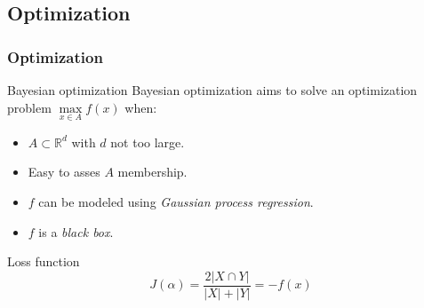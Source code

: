     \subsection{Optimization}
    \begin{frame}
        \frametitle{Optimization}
         {
            \begin{block}{Bayesian optimization}
                Bayesian optimization aims to solve an optimization problem $\max\limits_{x\in A}f\left(x\right)$ when:
                \begin{itemize}
                    \item $A \subset \mathbb{R}^d$ with $d$ not too large.
                    \item Easy to asses $A$ membership.
                    \item $f$ can be modeled using \emph{Gaussian process regression}.
                    \item $f$ is a \emph{black box}.
                \end{itemize}
            \end{block}
        }
         {
            \begin{exampleblock}{Loss function}
                \begin{equation}
                    J\left(\alpha\right) = \frac{2\lvert X \cap Y \rvert}{\lvert X \rvert + \lvert Y \rvert} = -f(x)
                \end{equation}
            \end{exampleblock}
        }
    \end{frame}
    
